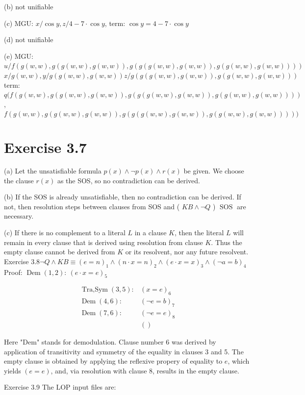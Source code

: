 \documentclass[10pt]{book}
\begin{document}
(b) not unifiable

(c) MGU: $x / \cos y, z / 4-7 \cdot \cos y$, term: $\cos y=4-7 \cdot \cos y$

(d) not unifiable

(e) MGU: $u / f(g(w, w), g(g(w, w), g(w, w)), g(g(g(w, w), g(w, w)), g(g(w, w), g(w, w))))$ $x / g(w, w), y / g(g(w, w), g(w, w)) z / g(g(g(w, w), g(w, w)), g(g(w, w), g(w, w)))$ term: $q(f(g(w, w), g(g(w, w), g(w, w)), g(g(g(w, w), g(w, w)), g(g(w, w), g(w, w))))$, $f(g(w, w), g(g(w, w), g(w, w)), g(g(g(w, w), g(w, w)), g(g(w, w), g(w, w)))))$

\section{Exercise 3.7}
(a) Let the unsatisfiable formula $p(x) \wedge \neg p(x) \wedge r(x)$ be given. We choose the clause $r(x)$ as the SOS, so no contradiction can be derived.

(b) If the SOS is already unsatisfiable, then no contradiction can be derived. If not, then resolution steps between clauses from SOS and ( $K B \wedge \neg Q$ ) $\operatorname{SOS}$ are necessary.

(c) If there is no complement to a literal $L$ in a clause $K$, then the literal $L$ will remain in every clause that is derived using resolution from clause $K$. Thus the empty clause cannot be derived from $K$ or its resolvent, nor any future resolvent.
Exercise $3.8 \neg Q \wedge K B \equiv (e=n)_{1} \wedge (n \cdot x=n)_{2} \wedge (e \cdot x=x)_{3} \wedge (\neg a=b)_{4}$\\
Proof: $\operatorname{Dem}(1,2): \ (e \cdot x=e)_{5}$

$$
\begin{array}{ll}
\operatorname{Tra,Sym}(3,5): & (x=e)_{6} \\
\operatorname{Dem}(4,6): & (\neg e=b)_{7} \\
\operatorname{Dem}(7,6): & (\neg e=e)_{8} \\
& ()
\end{array}
$$

Here "Dem" stands for demodulation. Clause number 6 was derived by application of transitivity and symmetry of the equality in clauses 3 and 5. The empty clause is obtained by applying the reflexive propery of equality to $e$, which yields $(e=e)$, and, via resolution with clause 8, results in the empty clause.

Exercise 3.9 The LOP input files are:
\end{document}
